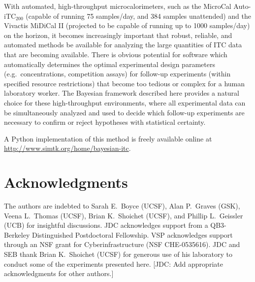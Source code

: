 \documentclass[aps,pre,twocolumn,nofootinbib,superscriptaddress,linenumbers]{revtex4-1}
\newcommand{\pyitc}{\url{http://www.simtk.org/home/bayesian-itc}} %
\begin{document}
With automated, high-throughput microcalorimeters, such as the MicroCal Auto-iTC$_{200}$ (capable of running 75 samples/day, and 384 samples unattended) and the Vivactis MiDiCal II (projected to be capable of running up to 1000 samples/day) on the horizon, it becomes increasingly important that robust, reliable, and automated methods be available for analyzing the large quantities of ITC data that are becoming available.
There is obvious potential for software which automatically determines the optimal experimental design parameters (e.g.~concentrations, competition assays) for follow-up experiments (within specified resource restrictions) that become too tedious or complex for a human laboratory worker.
The Bayesian framework described here provides a natural choice for these high-throughput environments, where all experimental data can be simultaneously analyzed and used to decide which follow-up experiments are necessary to confirm or reject hypotheses with statistical certainty.

A Python implementation of this method is freely available online at \pyitc.

\section{Acknowledgments}
\label{section:acknowledgments}

The authors are indebted to Sarah E.~Boyce (UCSF), Alan P.~Graves (GSK), Veena L.~Thomas (UCSF), Brian K.~Shoichet (UCSF), and Phillip L.~Geissler (UCB) for insightful discussions.
JDC acknowledges support from a QB3-Berkeley Distinguished Postdoctoral Fellowship.
VSP acknowledges support through an NSF grant for Cyberinfrastructure (NSF CHE-0535616).
JDC and SEB thank Brian K.~Shoichet (UCSF) for generous use of his laboratory to conduct some of the experiments presented here.
{\color{red}[JDC: Add appropriate acknowledgments for other authors.]}

\appendix
\eject
\end{document}
